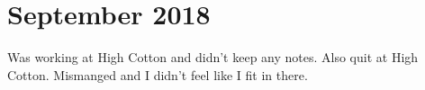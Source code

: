 \section{September 2018}
Was working at High Cotton and didn't keep any notes. Also quit at High Cotton. Mismanged and I didn't feel like I fit in there.
